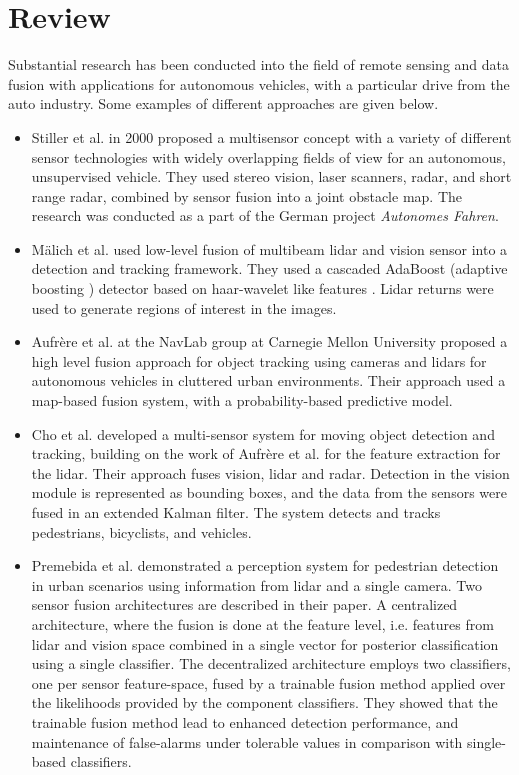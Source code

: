 \section{Review}
Substantial research has been conducted into the field of remote sensing and data fusion with applications for autonomous vehicles, with a particular drive from the auto industry. Some examples of different approaches are given below.
\begin{itemize}
	\item Stiller et al. \cite{STILLER2000389} in 2000 proposed a multisensor concept with a variety of different sensor technologies with widely overlapping fields of view for an autonomous, unsupervised vehicle. They used stereo vision, laser scanners, radar, and short range radar, combined by sensor fusion into a joint obstacle map. The research was conducted as a part of the German project \textit{Autonomes Fahren}.
	
	\item Mälich et al. \cite{sensorfusion_spatio_temporal} used low-level fusion of multibeam lidar and vision sensor into a detection and tracking framework. They used a cascaded AdaBoost (adaptive boosting \cite{machine_learning}) detector based on haar-wavelet like features \cite{CValg}. Lidar returns were used to generate regions of interest in the images.
	
	\item Aufrère et al. \cite{Aufrere} at the NavLab group at Carnegie Mellon University proposed a high level fusion approach for object tracking using cameras and lidars for autonomous vehicles in cluttered urban environments. Their approach used a map-based fusion system, with a probability-based predictive model.
	
	\item Cho et al. \cite{Cho_multisensor_fusion} developed a multi-sensor system for moving object detection and tracking, building on the work of Aufrère et al. for the feature extraction for the lidar. Their approach fuses vision, lidar and radar. Detection in the vision module is represented as bounding boxes, and the data from the sensors were fused in an extended Kalman filter. The system detects and tracks pedestrians, bicyclists, and vehicles.
	
	\item Premebida et al. \cite{ROB:ROB20312} demonstrated a perception system for pedestrian detection in urban scenarios using information from lidar and a single camera. Two sensor fusion architectures are described in their paper. A  centralized architecture, where the fusion is done at the feature level, i.e. features from lidar and vision space combined in a single vector for posterior classification using a single classifier. The decentralized architecture employs two classifiers, one per sensor feature-space, fused by a trainable fusion method applied over the likelihoods provided by the component classifiers. They showed that the trainable fusion method lead to enhanced detection performance, and maintenance of false-alarms under tolerable values in comparison with single-based classifiers.
	

\end{itemize}

